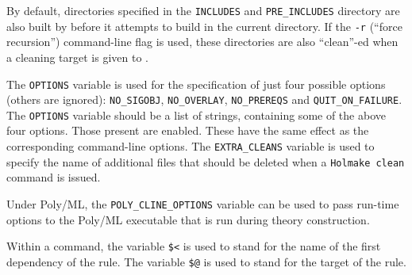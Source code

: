 By default, directories specified in the \texttt{INCLUDES} and \texttt{PRE\_INCLUDES} directory are also built by \holmake{} before it attempts to build in the current directory.
If the \texttt{-r} (``force recursion'') command-line flag is used, these directories are also ``clean''-ed when a cleaning target is given to \holmake{}.

The \texttt{OPTIONS} variable is used for the specification of just
four possible options (others are ignored): \texttt{NO\_SIGOBJ},
\texttt{NO\_OVERLAY}, \texttt{NO\_PREREQS} and
\texttt{QUIT\_ON\_FAILURE}.  The \texttt{OPTIONS} variable should be a
list of strings, containing some of the above four options.  Those
present are enabled.  These have the same effect as the corresponding
command-line options. The \texttt{EXTRA\_CLEANS} variable is used to
specify the name of additional files that should be deleted when a
\texttt{Holmake clean} command is issued.

Under Poly/ML, the \texttt{POLY\_CLINE\_OPTIONS} variable can be used to pass run-time options to the Poly/ML executable that is run during theory construction.

Within a command, the variable \texttt{\$<} is used to stand for the
name of the first dependency of the rule.  The variable \texttt{\$@} is
used to stand for the target of the rule.

